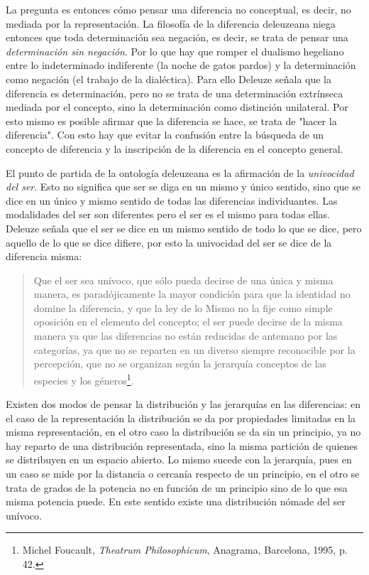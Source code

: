 \documentclass{book}
\begin{document}
La pregunta es entonces cómo pensar una diferencia no conceptual, es
decir, no mediada por la representación. La filosofía de la diferencia
deleuzeana niega entonces que toda determinación sea negación, es decir,
se trata de pensar una \emph{determinación sin negación}. Por lo que hay
que romper el dualismo hegeliano entre lo indeterminado indiferente (la
noche de gatos pardos) y la determinación como negación (el trabajo de
la dialéctica). Para ello Deleuze señala que la diferencia es
determinación, pero no se trata de una determinación extrínseca mediada
por el concepto, sino la determinación como distinción unilateral. Por
esto mismo es posible afirmar que la diferencia se hace, se trata de
"hacer la diferencia". Con esto hay que evitar la confusión entre la
búsqueda de un concepto de diferencia y la inscripción de la diferencia
en el concepto general.

El punto de partida de la ontología deleuzeana es la afirmación de la
\emph{univocidad del ser}. Esto no significa que ser se diga en un mismo
y único sentido, sino que se dice en un único y mismo sentido de todas
las diferencias individuantes. Las modalidades del ser son diferentes
pero el ser es el mismo para todas ellas. Deleuze señala que el ser se
dice en un mismo sentido de todo lo que se dice, pero aquello de lo que
se dice difiere, por esto la univocidad del ser se dice de la diferencia
misma:

\begin{quote}
Que el ser sea unívoco, que sólo pueda decirse de una única y misma
manera, es paradójicamente la mayor condición para que la identidad no
domine la diferencia, y que la ley de lo Mismo no la fije como simple
oposición en el elemento del concepto; el ser puede decirse de la misma
manera ya que las diferencias no están reducidas de antemano por las
categorías, ya que no se reparten en un diverso siempre reconocible por
la percepción, que no se organizan según la jerarquía conceptos de las
especies y los géneros\footnote{Michel Foucault, \emph{Theatrum
  Philosophicum}, Anagrama, Barcelona, 1995, p. 42.}.
\end{quote}

Existen dos modos de pensar la distribución y las jerarquías en las
diferencias: en el caso de la representación la distribución se da por
propiedades limitadas en la misma representación, en el otro caso la
distribución se da sin un principio, ya no hay reparto de una
distribución representada, sino la misma partición de quienes se
distribuyen en un espacio abierto. Lo mismo sucede con la jerarquía,
pues en un caso se mide por la distancia o cercanía respecto de un
principio, en el otro se trata de grados de la potencia no en función de
un principio sino de lo que esa misma potencia puede. En este sentido
existe una distribución nómade del ser unívoco.
\end{document}
